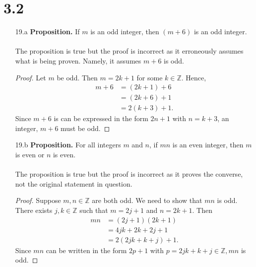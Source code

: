 \documentclass[]{article}
\begin{document}
\section*{3.2}
	\begin{itemize}
		\item[19.a] \textbf{Proposition.} If $m$ is an odd integer, then $(m + 6)$ is an odd integer. \\
			\\
			The proposition is true but the proof is incorrect as it erroneously assumes what is being proven. Namely, it assumes $m + 6$ is odd.
			\begin{proof}
				Let $m$ be odd. Then $m = 2k + 1$ for some $k \in \mathbb{Z}$. Hence,
				\begin{align*}
					m + 6 &= (2k + 1) + 6 \\
					&= (2k + 6) + 1 \\
					&= 2(k + 3) + 1.
				\end{align*}
				Since $m + 6$ is can be expressed in the form $2n + 1$ with $n = k + 3$, an integer, $m + 6$ must be odd.
			\end{proof}
		\item[19.b] \textbf{Proposition.} For all integers $m$ and $n$, if $mn$ is an even integer, then $m$ is even or $n$ is even. \\
		\\
		The proposition is true but the proof is incorrect as it proves the converse, not the original statement in question. 
		\begin{proof}
			Suppose $m, n \in \mathbb{Z}$ are both odd. We need to show that $mn$ is odd. There exists $j, k \in \mathbb{Z}$ such that $m = 2j + 1$ and $n = 2k + 1$. Then
			\begin{align*}
				mn &= (2j + 1)(2k + 1) \\
				&= 4jk + 2k + 2j + 1 \\
				&= 2(2jk + k + j) + 1.
			\end{align*}
		    Since $mn$ can be written in the form $2p + 1$ with $p = 2jk + k + j \in \mathbb{Z}, mn$ is odd.
		\end{proof}
	\end{itemize}
\end{document}
